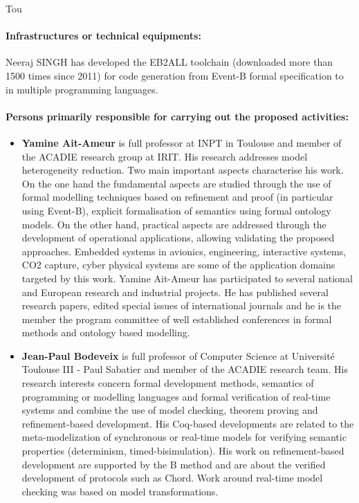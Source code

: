 \begin{sitedescription}{Tou}


\paragraph{Infrastructures or technical equipments:}
Neeraj SINGH  has  developed the EB2ALL toolchain (downloaded more than 1500 times since 2011)  for code generation  from Event-B formal specification to in multiple programming languages.


\paragraph{Persons primarily responsible for carrying out the proposed activities:}

\begin{itemize} %

\item{\bf   Yamine Ait-Ameur}    is full professor at INPT in Toulouse and member of the ACADIE research group at IRIT. 
 His research addresses model heterogeneity reduction. Two main important aspects characterise his work. On the one hand the fundamental aspects are studied through the use of formal modelling techniques based on refinement and proof (in particular using Event-B), explicit formalisation of semantics using formal ontology models. On the other hand, practical aspects are addressed through the development of operational applications, allowing validating the proposed approaches. Embedded systems in avionics, engineering, interactive systems, CO2 capture, cyber physical systems are some of the application domains targeted by this work.  
Yamine Ait-Ameur has participated to several national and European research and industrial projects.   He has published several research papers, edited special issues of international journals and he is the member the program committee of well established conferences in formal methods and ontology based modelling.

\item{\bf  Jean-Paul Bodeveix} is full professor of Computer Science at Universit\'e Toulouse III - Paul Sabatier  and member of the ACADIE research team. His research interests concern formal development
methods, semantics of programming or modelling languages and formal verification of real-time systems and combine the use of model checking, theorem proving and refinement-based development. His Coq-based developments are related to the meta-modelization of synchronous or real-time models for verifying semantic properties (determinism, timed-bisimulation). His work on refinement-based development are supported by the B method and are about the verified development of protocols such as Chord. Work around real-time model checking was based on model transformations.




\end{itemize}
\end{sitedescription}
